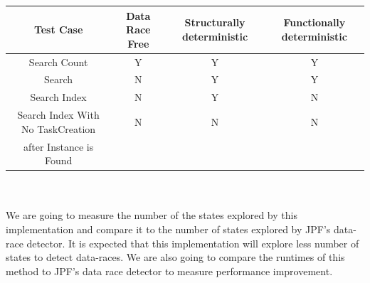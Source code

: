 \begin{enumerate}
\begin{tabular}{ | c | c | c | c |}
  \hline
  \textbf{Test Case} & \textbf{Data Race Free} & \textbf{Structurally deterministic} & \textbf{Functionally deterministic} \\
  \hline
  Search Count & Y & Y & Y \\
  \hline
  Search & N & Y & Y \\
  \hline
  Search Index & N & Y & N\\
  \hline 
  Search Index With No TaskCreation & N & N & N\\
   after Instance is Found  & & & \\
  \hline 
\end{tabular}
\\
\\
We are going to measure the number of the states explored by this implementation and compare it to the number of states explored by JPF's data-race detector. It is expected that this implementation will explore less number of states to detect data-races. We are also going to compare the runtimes of this method to JPF's data race detector to measure performance improvement.

\end{enumerate}